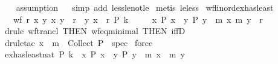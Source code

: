 \begin{isabellebody}
\ \ \isamarkupfalse%
\ assumption\isanewline
\ \isamarkupfalse%
\ {\isacharparenleft}{\kern0pt}simp\ add{\isacharcolon}{\kern0pt}\ less{\isacharunderscore}{\kern0pt}le{\isacharunderscore}{\kern0pt}not{\isacharunderscore}{\kern0pt}le{\isacharparenright}{\kern0pt}\isanewline
{}\isamarkupfalse%
\ {\isacharparenleft}{\kern0pt}metis\ le{\isacharunderscore}{\kern0pt}less{\isacharparenright}{\kern0pt}%
\endisatagproof
{\isafoldproof}%
%
\isadelimproof
\isanewline
%
\endisadelimproof
\isanewline
{}\isamarkupfalse%
\ wf{\isacharunderscore}{\kern0pt}linord{\isacharunderscore}{\kern0pt}ex{\isacharunderscore}{\kern0pt}has{\isacharunderscore}{\kern0pt}least{\isacharcolon}{\kern0pt}\isanewline
\ \ {\isachardoublequoteopen}{\isasymlbrakk}\ wf\ r{\isacharsemicolon}{\kern0pt}\ {\isasymforall}x\ y{\isachardot}{\kern0pt}\ {\isacharparenleft}{\kern0pt}x{\isacharcomma}{\kern0pt}\ y{\isacharparenright}{\kern0pt}\ {\isasymin}\ r\isactrlsup {\isacharplus}{\kern0pt}\ {\isasymlongleftrightarrow}\ {\isacharparenleft}{\kern0pt}y{\isacharcomma}{\kern0pt}\ x{\isacharparenright}{\kern0pt}\ {\isasymnotin}\ r\isactrlsup {\isacharasterisk}{\kern0pt}{\isacharsemicolon}{\kern0pt}\ P\ k\ {\isasymrbrakk}\isanewline
\ \ \ {\isasymLongrightarrow}\ {\isasymexists}x{\isachardot}{\kern0pt}\ P\ x\ {\isasymand}\ {\isacharparenleft}{\kern0pt}{\isasymforall}y{\isachardot}{\kern0pt}\ P\ y\ {\isasymlongrightarrow}\ {\isacharparenleft}{\kern0pt}m\ x{\isacharcomma}{\kern0pt}\ m\ y{\isacharparenright}{\kern0pt}\ {\isasymin}\ r\isactrlsup {\isacharasterisk}{\kern0pt}{\isacharparenright}{\kern0pt}{\isachardoublequoteclose}\isanewline
%
\isadelimproof
%
\endisadelimproof
%
\isatagproof
{}\isamarkupfalse%
\ {\isacharparenleft}{\kern0pt}drule\ wf{\isacharunderscore}{\kern0pt}trancl\ {\isacharbrackleft}{\kern0pt}THEN\ wf{\isacharunderscore}{\kern0pt}eq{\isacharunderscore}{\kern0pt}minimal\ {\isacharbrackleft}{\kern0pt}THEN\ iffD{}{\isacharbrackright}{\kern0pt}{\isacharbrackright}{\kern0pt}{\isacharparenright}{\kern0pt}\isanewline
{}\isamarkupfalse%
\ {\isacharparenleft}{\kern0pt}drule{\isacharunderscore}{\kern0pt}tac\ x\ {\isacharequal}{\kern0pt}\ {\isachardoublequoteopen}m\ {\isacharbackquote}{\kern0pt}\ Collect\ P{\isachardoublequoteclose}\ \ spec{\isacharparenright}{\kern0pt}\isanewline
{}\isamarkupfalse%
\ force%
\endisatagproof
{\isafoldproof}%
%
\isadelimproof
\isanewline
%
\endisadelimproof
\isanewline
{}\isamarkupfalse%
\ ex{\isacharunderscore}{\kern0pt}has{\isacharunderscore}{\kern0pt}least{\isacharunderscore}{\kern0pt}nat{\isacharcolon}{\kern0pt}\ {\isachardoublequoteopen}P\ k\ {\isasymLongrightarrow}\ {\isasymexists}x{\isachardot}{\kern0pt}\ P\ x\ {\isasymand}\ {\isacharparenleft}{\kern0pt}{\isasymforall}y{\isachardot}{\kern0pt}\ P\ y\ {\isasymlongrightarrow}\ m\ x\ {\isasymle}\ m\ y{\isacharparenright}{\kern0pt}{\isachardoublequoteclose}\isanewline

\end{isabellebody}
